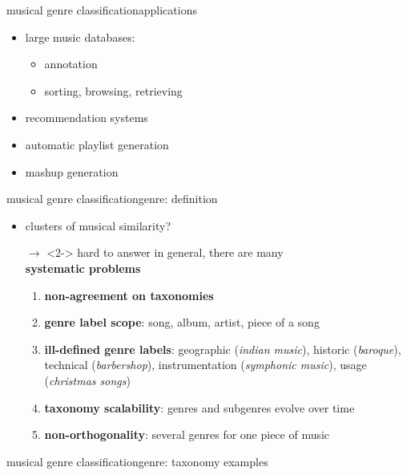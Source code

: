         \begin{frame}{musical genre classification}{applications}
            \begin{itemize}
                \item	large music databases:
                    \begin{itemize}
                        \item	annotation
                        \item	sorting, browsing, retrieving
                    \end{itemize}
                \item recommendation systems
                \item	automatic playlist generation
                \item	mashup generation
            \end{itemize}
        \end{frame}

        \begin{frame}{musical genre classification}{genre: definition}

            \begin{itemize}
                \item   clusters of musical similarity?
                \item[$\rightarrow$]<2->             hard to answer in general, there are many\\ \textbf{systematic problems}
                    \begin{enumerate}
                        \item<4->	\textbf{non-agreement on taxonomies}
                        \item<5->   \textbf{genre label scope}: song, album, artist, piece of a song
                        \item<6->	\textbf{ill-defined genre labels}: geographic (\textit{indian music}), historic (\textit{baroque}), technical (\textit{barbershop}), instrumentation (\textit{symphonic music}), usage (\textit{christmas songs})
                        \item<7->	\textbf{taxonomy scalability}: genres and subgenres evolve over time
                        \item<8->	\textbf{non-orthogonality}: several genres for one piece of music
                    \end{enumerate}

            \end{itemize}
            
        \end{frame}
        \begin{frame}{musical genre classification}{genre: taxonomy examples}
                \vspace{-20mm}
                \begin{center}
                \scalebox{.6}
                {
                    
                }
                \end{center}
        \end{frame}

